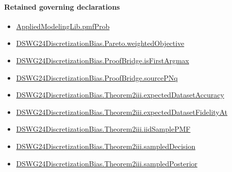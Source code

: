 \documentclass[10pt]{article}
\begin{document}
\paragraph{Retained governing declarations}
\begin{itemize}\raggedright
\item \hyperlink{governing-declaration-9c38d53b9d664221}{Applied\allowbreak{}Modeling\allowbreak{}Lib.\allowbreak{}pmf\allowbreak{}Prob}
\item \hyperlink{governing-declaration-d0facd526e2aa2ff}{DSWG24\allowbreak{}Discretization\allowbreak{}Bias.\allowbreak{}Pareto.\allowbreak{}weighted\allowbreak{}Objective}
\item \hyperlink{governing-declaration-af44c4b45082ddcb}{DSWG24\allowbreak{}Discretization\allowbreak{}Bias.\allowbreak{}Proof\allowbreak{}Bridge.\allowbreak{}is\allowbreak{}First\allowbreak{}Argmax}
\item \hyperlink{governing-declaration-9631b3d6800a2bd3}{DSWG24\allowbreak{}Discretization\allowbreak{}Bias.\allowbreak{}Proof\allowbreak{}Bridge.\allowbreak{}source\allowbreak{}P\allowbreak{}Nq}
\item \hyperlink{governing-declaration-daac633422a44729}{DSWG24\allowbreak{}Discretization\allowbreak{}Bias.\allowbreak{}Theorem2iii.\allowbreak{}expected\allowbreak{}Dataset\allowbreak{}Accuracy}
\item \hyperlink{governing-declaration-8158479406f1d885}{DSWG24\allowbreak{}Discretization\allowbreak{}Bias.\allowbreak{}Theorem2iii.\allowbreak{}expected\allowbreak{}Dataset\allowbreak{}Fidelity\allowbreak{}At}
\item \hyperlink{governing-declaration-b906fbb2f231ab40}{DSWG24\allowbreak{}Discretization\allowbreak{}Bias.\allowbreak{}Theorem2iii.\allowbreak{}iid\allowbreak{}Sample\allowbreak{}PMF}
\item \hyperlink{governing-declaration-05d42de5dba2851d}{DSWG24\allowbreak{}Discretization\allowbreak{}Bias.\allowbreak{}Theorem2iii.\allowbreak{}sampled\allowbreak{}Decision}
\item \hyperlink{governing-declaration-457b4184b0081169}{DSWG24\allowbreak{}Discretization\allowbreak{}Bias.\allowbreak{}Theorem2iii.\allowbreak{}sampled\allowbreak{}Posterior}
\end{itemize}
\end{document}
